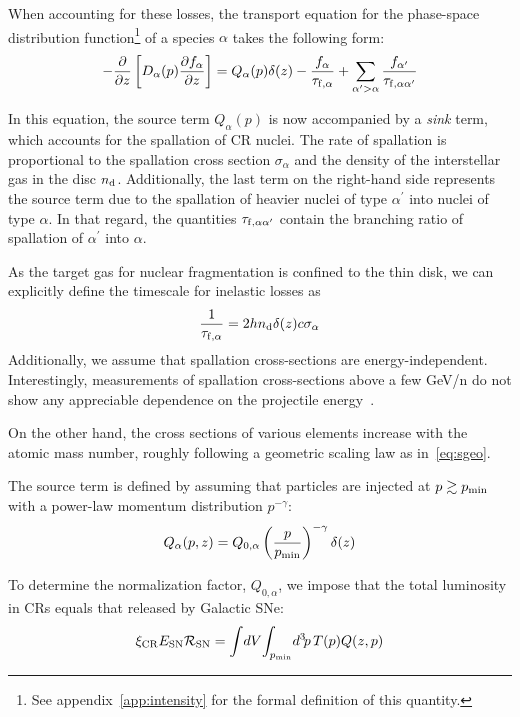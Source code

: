 When accounting for these losses, the transport equation for the phase-space distribution function\footnote{See appendix~\ref{app:intensity} for the formal definition of this quantity.} of a species $\alpha$ takes the following form:
%
\begin{equation}
-\frac{\partial}{\partial z} \left[ D_\alpha(p) \frac{\partial f_\alpha}{\partial z} \right] = 
Q_\alpha(p) \delta(z) - \frac{f_\alpha}{\tau_{\rm f, \alpha}} + \sum_{\alpha^\prime > \alpha}  \frac{f_{\alpha^\prime}}{\tau_{\rm f, \alpha\alpha^\prime}}
\end{equation}

In this equation, the source term $Q_\alpha(p)$ is now accompanied by a \emph{sink} term, which accounts for the spallation of CR nuclei. The rate of spallation is proportional to the spallation cross section $\sigma_\alpha$ and the density of the interstellar gas in the disc $n_{\rm d}$. Additionally, the last term on the right-hand side represents the source term due to the spallation of heavier nuclei of type $\alpha^\prime$ into nuclei of type $\alpha$. In that regard, the quantities $\tau_{\rm f, \alpha\alpha^\prime}$ contain the branching ratio of spallation of $\alpha^\prime$ into $\alpha$.

As the target gas for nuclear fragmentation is confined to the thin disk, we can explicitly define the timescale for inelastic losses as
%
\begin{equation}
\frac{1}{\tau_{\rm f, \alpha}} = 2 h n_{\rm d} \delta (z) c \sigma_\alpha
\label{eq:scalingcs}
\end{equation}
%
Additionally, we assume that spallation cross-sections are energy-independent. Interestingly, measurements of spallation cross-sections above a few GeV/n do not show any appreciable dependence on the projectile energy~\cite{Evoli2019prd}.

On the other hand, the cross sections of various elements increase with the atomic mass number, roughly following a geometric scaling law as in~\cref{eq:sgeo}.

The source term is defined by assuming that particles are injected at $p \gtrsim p_{\rm min}$ with a power-law momentum distribution $p^{-\gamma}$:
%
\begin{equation}
Q_\alpha(p, z) = Q_{0,\alpha} \left(\frac{p}{p_{\rm min}}\right)^{-\gamma} \delta (z) 
\end{equation}

To determine the normalization factor, $Q_{0,\alpha}$, we impose that the total luminosity in CRs equals that released by Galactic SNe:
%
\begin{equation}
\xi_{\rm CR} E_{\rm SN} \mathcal R_{\rm SN} = \int \! dV \! \int_{p_{\rm min}} \! d^3 \! p \, T(p) Q(z,p)
\end{equation}

